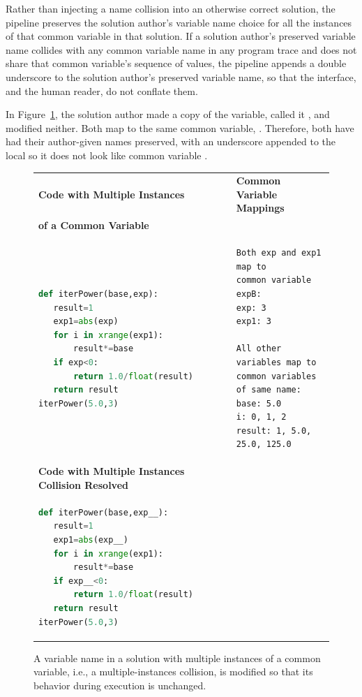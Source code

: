 Rather than injecting a name collision into an otherwise correct solution, the pipeline preserves the solution author's variable name choice for all the instances of that common variable in that solution. If a solution author's preserved variable name collides with any common variable name in any program trace and does not share that common variable's sequence of values, the pipeline appends a double underscore to the solution author's preserved variable name, so that the interface, and the human reader, do not conflate them.

In Figure~\ref{fig:multiinst}, the solution author made a copy of the  variable, called it , and modified neither. Both map to the same common variable, . Therefore, both have had their author-given names preserved, with an underscore appended to the local  so it does not look like common variable . 
\begin{figure}
\begin{tabular}{ll}
{\bf Code with Multiple Instances} & {\bf Common Variable Mappings} \\
{\bf of a Common Variable} & \\
\begin{minipage}{0.4\linewidth}
\begin{lstlisting}[basicstyle=\linespread{1.0}\ttfamily\footnotesize,language=python]
def iterPower(base,exp):
   result=1
   exp1=abs(exp)
   for i in xrange(exp1):
       result*=base
   if exp<0:
       return 1.0/float(result)
   return result
iterPower(5.0,3)
\end{lstlisting}
\end{minipage}
&
\begin{minipage}{0.6\linewidth}
\begin{lstlisting}[basicstyle=\linespread{1.0}\ttfamily\footnotesize]
Both exp and exp1 map to
common variable expB:
exp: 3 
exp1: 3 

All other variables map to
common variables of same name:
base: 5.0 
i: 0, 1, 2 
result: 1, 5.0, 25.0, 125.0 
\end{lstlisting}
\end{minipage} \\
{\bf Code with Multiple Instances Collision Resolved} & \\
\begin{minipage}{0.4\linewidth}
\begin{lstlisting}[basicstyle=\linespread{1.0}\ttfamily\footnotesize,language=python,linebackgroundcolor={\lstcolorlines[gray!20]{1,3,6}}]
def iterPower(base,exp__):
   result=1
   exp1=abs(exp__)
   for i in xrange(exp1):
       result*=base
   if exp__<0:
       return 1.0/float(result)
   return result
iterPower(5.0,3)
\end{lstlisting}
\end{minipage}
& \\
\end{tabular}
\caption{A variable name in a solution with multiple instances of a common variable, i.e., a multiple-instances collision, is modified so that its behavior during execution is unchanged.}
\label{fig:multiinst}
\end{figure}

